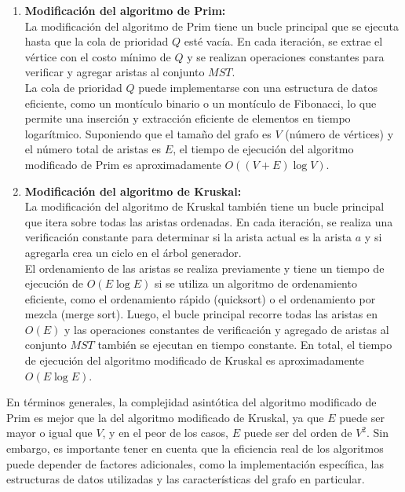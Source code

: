 \begin{enumerate}
  \item \textbf{Modificación del algoritmo de Prim:}\\
  La modificación del algoritmo de Prim tiene un bucle principal que se ejecuta hasta que la cola de prioridad $Q$ esté vacía. En cada iteración, se extrae el vértice con el costo mínimo de $Q$ y se realizan operaciones constantes para verificar y agregar aristas al conjunto $MST$.\\

  La cola de prioridad $Q$ puede implementarse con una estructura de datos eficiente, como un montículo binario o un montículo de Fibonacci, lo que permite una inserción y extracción eficiente de elementos en tiempo logarítmico. Suponiendo que el tamaño del grafo es $V$ (número de vértices) y el número total de aristas es $E$, el tiempo de ejecución del algoritmo modificado de Prim es aproximadamente $O((V + E) \log V)$.
  \item \textbf{Modificación del algoritmo de Kruskal:}\\
  La modificación del algoritmo de Kruskal también tiene un bucle principal que itera sobre todas las aristas ordenadas. En cada iteración, se realiza una verificación constante para determinar si la arista actual es la arista $a$ y si agregarla crea un ciclo en el árbol generador.\\

  El ordenamiento de las aristas se realiza previamente y tiene un tiempo de ejecución de $O(E \log E)$ si se utiliza un algoritmo de ordenamiento eficiente, como el ordenamiento rápido (quicksort) o el ordenamiento por mezcla (merge sort). Luego, el bucle principal recorre todas las aristas en $O(E)$ y las operaciones constantes de verificación y agregado de aristas al conjunto $MST$ también se ejecutan en tiempo constante. En total, el tiempo de ejecución del algoritmo modificado de Kruskal es aproximadamente $O(E \log E)$.

\end{enumerate}

En términos generales, la complejidad asintótica del algoritmo modificado de Prim es mejor que la del algoritmo modificado de Kruskal, ya que $E$ puede ser mayor o igual que $V$, y en el peor de los casos, $E$ puede ser del orden de $V^2$. Sin embargo, es importante tener en cuenta que la eficiencia real de los algoritmos puede depender de factores adicionales, como la implementación específica, las estructuras de datos utilizadas y las características del grafo en particular.
